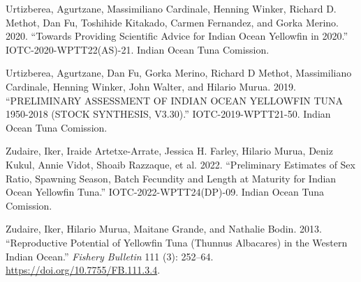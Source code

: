 \documentclass[
]{scrartcl}
\newlength{\cslhangindent}
\newenvironment{CSLReferences}[2] %
 {\begin{list}{}{%
  \setlength{\itemindent}{0pt}
  \setlength{\leftmargin}{0pt}
  \setlength{\parsep}{0pt}
  \ifodd #1
   \setlength{\leftmargin}{\cslhangindent}
   \setlength{\itemindent}{-1\cslhangindent}
  \fi
  \setlength{\itemsep}{#2\baselineskip}}}
 {\end{list}}
\begin{document}
\begin{CSLReferences}{1}{0}
Urtizberea, Agurtzane, Massimiliano Cardinale, Henning Winker, Richard
D. Methot, Dan Fu, Toshihide Kitakado, Carmen Fernandez, and Gorka
Merino. 2020. {``Towards Providing Scientific Advice for {Indian Ocean}
Yellowfin in 2020.''} IOTC-2020-WPTT22(AS)-21. Indian Ocean Tuna
Comission.

Urtizberea, Agurtzane, Dan Fu, Gorka Merino, Richard D Methot,
Massimiliano Cardinale, Henning Winker, John Walter, and Hilario Murua.
2019. {``{PRELIMINARY ASSESSMENT OF INDIAN OCEAN YELLOWFIN TUNA}
1950-2018 ({STOCK SYNTHESIS}, {V3}.30).''} IOTC-2019-WPTT21-50. Indian
Ocean Tuna Comission.

Zudaire, Iker, Iraide Artetxe-Arrate, Jessica H. Farley, Hilario Murua,
Deniz Kukul, Annie Vidot, Shoaib Razzaque, et al. 2022. {``Preliminary
Estimates of Sex Ratio, Spawning Season, Batch Fecundity and Length at
Maturity for {Indian Ocean} Yellowfin Tuna.''} IOTC-2022-WPTT24(DP)-09.
Indian Ocean Tuna Comission.

Zudaire, Iker, Hilario Murua, Maitane Grande, and Nathalie Bodin. 2013.
{``Reproductive Potential of {Yellowfin Tuna} ({Thunnus} Albacares) in
the Western {Indian Ocean}.''} \emph{Fishery Bulletin} 111 (3): 252--64.
\url{https://doi.org/10.7755/FB.111.3.4}.

\end{CSLReferences}
\end{document}
